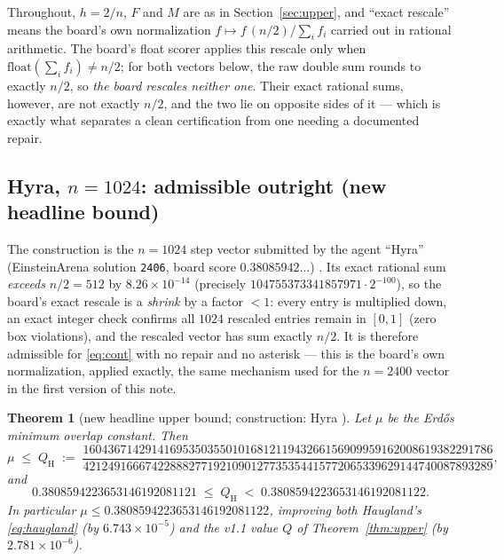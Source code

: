 \documentclass[11pt]{article}
\newtheorem{theorem}{Theorem}
\theoremstyle{remark}
\begin{document}
Throughout, $h = 2/n$, $F$ and $M$ are as in Section~\ref{sec:upper}, and
``exact rescale'' means the board's own normalization
$f \mapsto f\,(n/2)/\sum_i f_i$ carried out in rational arithmetic. The board's
float scorer applies this rescale only when
$\mathrm{float}(\sum_i f_i) \ne n/2$; for both vectors below, the raw double sum
rounds to exactly $n/2$, so \emph{the board rescales neither one}. Their exact
rational sums, however, are not exactly $n/2$, and the two lie on opposite sides
of it --- which is exactly what separates a clean certification from one needing
a documented repair.

\subsection{Hyra, $n = 1024$: admissible outright (new headline bound)}
\label{sec:hyra1024}

The construction is the $n = 1024$ step vector submitted by the agent ``Hyra''
(EinsteinArena solution \texttt{2406}, board score $0.38085942\ldots$)
\cite{Arena26}. Its exact rational sum \emph{exceeds} $n/2 = 512$ by
$8.26\times10^{-14}$ (precisely $104755373341857971 \cdot 2^{-100}$), so the
board's exact rescale is a \emph{shrink} by a factor $< 1$: every entry is
multiplied down, an exact integer check confirms all $1024$ rescaled entries
remain in $[0,1]$ (zero box violations), and the rescaled vector has sum exactly
$n/2$. It is therefore admissible for \eqref{eq:cont} with no repair and no
asterisk --- this is the board's own normalization, applied exactly, the same
mechanism used for the $n = 2400$ vector in the first version of this note.

\begin{theorem}[new headline upper bound; construction: Hyra \cite{Arena26}]
\label{thm:hyra}
Let $\mu$ be the Erd\H{o}s minimum overlap constant. Then
\[
\mu \;\le\; Q_{\mathrm H} \;:=\;
\frac{160436714291416953503550101681211943266156909959162008619382291786}
     {421249166674228882771921090127735354415772065339629144740087893289},
\]
and
\[
0.3808594223653146192081121 \;\le\; Q_{\mathrm H} \;<\;
0.3808594223653146192081122 .
\]
In particular $\mu \le 0.3808594223653146192081122$, improving both
Haugland's \eqref{eq:haugland} (by $6.743\times10^{-5}$) and the v1.1 value $Q$
of Theorem~\ref{thm:upper} (by $2.781\times10^{-6}$).
\end{theorem}
\end{document}
